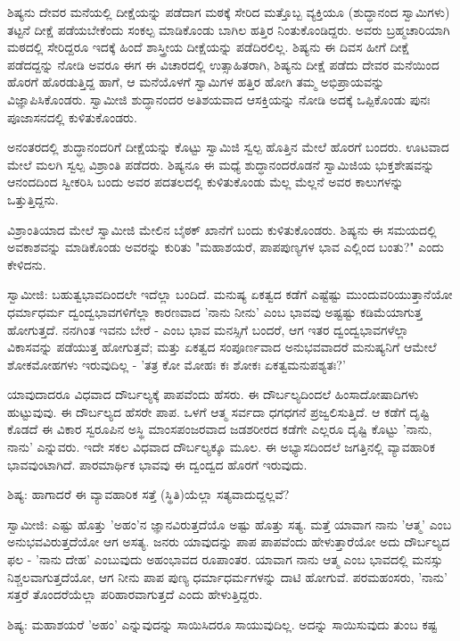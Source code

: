 ಶಿಷ್ಯನು ದೇವರ ಮನೆಯಲ್ಲಿ ದೀಕ್ಷೆಯನ್ನು ಪಡೆದಾಗ ಮಠಕ್ಕೆ ಸೇರಿದ ಮತ್ತೊಬ್ಬ ವ್ಯಕ್ತಿಯೂ (ಶುದ್ಧಾನಂದ ಸ್ವಾಮಿಗಳು) ತಟ್ಟನೆ ದೀಕ್ಷೆ ಪಡೆಯಬೇಕೆಂದು ಸಂಕಲ್ಪ ಮಾಡಿಕೊಂಡು ಬಾಗಿಲ ಹತ್ತಿರ ನಿಂತುಕೊಂಡಿದ್ದರು. ಅವರು ಬ್ರಹ್ಮಚಾರಿಯಾಗಿ ಮಠದಲ್ಲಿ ಸೇರಿದ್ದರೂ ಇದಕ್ಕೆ ಹಿಂದೆ ಶಾಸ್ತ್ರೀಯ ದೀಕ್ಷೆಯನ್ನು ಪಡೆದಿರಲಿಲ್ಲ. ಶಿಷ್ಯನು ಈ ದಿವಸ ಹೀಗೆ ದೀಕ್ಷೆ ಪಡೆದದ್ದನ್ನು ನೋಡಿ ಅವರೂ ಈಗ ಈ ವಿಚಾರದಲ್ಲಿ ಉತ್ಸಾಹಿತರಾಗಿ, ಶಿಷ್ಯನು ದೀಕ್ಷೆ ಪಡೆದು ದೇವರ ಮನೆಯಿಂದ ಹೊರಗೆ ಹೊರಡುತ್ತಿದ್ದ ಹಾಗೆ, ಆ ಮನೆಯೊಳಗೆ ಸ್ವಾಮಿಗಳ ಹತ್ತಿರ ಹೋಗಿ ತಮ್ಮ ಅಭಿಪ್ರಾಯವನ್ನು ವಿಜ್ಞಾಪಿಸಿಕೊಂಡರು. ಸ್ವಾಮೀಜಿ ಶುದ್ಧಾನಂದರ ಅತಿಶಯವಾದ ಆಸಕ್ತಿಯನ್ನು ನೋಡಿ ಅದಕ್ಕೆ ಒಪ್ಪಿಕೊಂಡು ಪುನಃ ಪೂಜಾಸನದಲ್ಲಿ ಕುಳಿತುಕೊಂಡರು.

ಅನಂತರದಲ್ಲಿ ಶುದ್ಧಾನಂದರಿಗೆ ದೀಕ್ಷೆಯನ್ನು ಕೊಟ್ಟು ಸ್ವಾಮಿಜಿ ಸ್ವಲ್ಪ ಹೊತ್ತಿನ ಮೇಲೆ ಹೊರಗೆ ಬಂದರು. ಊಟವಾದ ಮೇಲೆ ಮಲಗಿ ಸ್ವಲ್ಪ ವಿಶ್ರಾಂತಿ ಪಡೆದರು. ಶಿಷ್ಯನೂ ಈ ಮಧ್ಯೆ ಶುದ್ಧಾನಂದರೊಡನೆ ಸ್ವಾಮಿಜಿಯ ಭುಕ್ತಶೇಷವನ್ನು ಆನಂದದಿಂದ ಸ್ವೀಕರಿಸಿ ಬಂದು ಅವರ ಪದತಲದಲ್ಲಿ ಕುಳಿತುಕೊಂಡು ಮೆಲ್ಲ ಮೆಲ್ಲನೆ ಅವರ ಕಾಲುಗಳನ್ನು ಒತ್ತುತ್ತಿದ್ದನು.

ವಿಶ್ರಾಂತಿಯಾದ ಮೇಲೆ ಸ್ವಾಮೀಜಿ ಮೇಲಿನ ಬೈಠಕ್ ಖಾನೆಗೆ ಬಂದು ಕುಳಿತುಕೊಂಡರು. ಶಿಷ್ಯನು ಈ ಸಮಯದಲ್ಲಿ ಅವಕಾಶವನ್ನು ಮಾಡಿಕೊಂಡು ಅವರನ್ನು ಕುರಿತು "ಮಹಾಶಯರೆ, ಪಾಪಪುಣ್ಯಗಳ ಭಾವ ಎಲ್ಲಿಂದ ಬಂತು?" ಎಂದು ಕೇಳಿದನು.

ಸ್ವಾಮೀಜಿ: ಬಹುತ್ವಭಾವದಿಂದಲೇ ಇದೆಲ್ಲಾ ಬಂದಿದೆ. ಮನುಷ್ಯ ಏಕತ್ವದ ಕಡೆಗೆ ಎಷ್ಟೆಷ್ಟು ಮುಂದುವರಿಯುತ್ತಾನೆಯೋ ಧರ್ಮಾಧರ್ಮ ದ್ವಂದ್ವಭಾವಗಳಿಗೆಲ್ಲಾ ಕಾರಣವಾದ 'ನಾನು ನೀನು' ಎಂಬ ಭಾವವು ಅಷ್ಟಷ್ಟು ಕಡಿಮೆಯಾಗುತ್ತ ಹೋಗುತ್ತದೆ. ನನಗಿಂತ ಇವನು ಬೇರೆ - ಎಂಬ ಭಾವ ಮನಸ್ಸಿಗೆ ಬಂದರೆ, ಆಗ ಇತರ ದ್ವಂದ್ವಭಾವಗಳೆಲ್ಲಾ ವಿಕಾಸವನ್ನು ಪಡೆಯುತ್ತ ಹೋಗುತ್ತವೆ; ಮತ್ತು ಏಕತ್ವದ ಸಂಪೂರ್ಣವಾದ ಅನುಭವವಾದರೆ ಮನುಷ್ಯನಿಗೆ ಆಮೇಲೆ ಶೋಕಮೋಹಗಳು ಇರುವುದಿಲ್ಲ - 'ತತ್ರ ಕೋ ಮೋಹಃ ಕಃ ಶೋಕಃ ಏಕತ್ವಮನುಪಶ್ಯತಃ?'

ಯಾವುದಾದರೂ ವಿಧವಾದ ದೌರ್ಬಲ್ಯಕ್ಕೆ ಪಾಪವೆಂದು ಹೆಸರು. ಈ ದೌರ್ಬಲ್ಯದಿಂದಲೆ ಹಿಂಸಾದೋಷಾದಿಗಳು ಹುಟ್ಟುವುವು. ಈ ದೌರ್ಬಲ್ಯದ ಹೆಸರೇ ಪಾಪ. ಒಳಗೆ ಆತ್ಮ ಸರ್ವದಾ ಧಗಧಗನೆ ಪ್ರಜ್ವಲಿಸುತ್ತಿದೆ. ಆ ಕಡೆಗೆ ದೃಷ್ಟಿ ಕೊಡದೆ ಈ ವಿಕಾರ ಸ್ವರೂಪಿನ ಅಸ್ಥಿ ಮಾಂಸಪಂಜರವಾದ ಜಡಶರೀರದ ಕಡೆಗೇ ಎಲ್ಲರೂ ದೃಷ್ಟಿ ಕೊಟ್ಟು 'ನಾನು, ನಾನು' ಎನ್ನುವರು. ಇದೇ ಸಕಲ ವಿಧವಾದ ದೌರ್ಬಲ್ಯಕ್ಕೂ ಮೂಲ. ಈ ಅಭ್ಯಾಸದಿಂದಲೆ ಜಗತ್ತಿನಲ್ಲಿ ವ್ಯಾವಹಾರಿಕ ಭಾವವುಂಟಾಗಿದೆ. ಪಾರಮಾರ್ಥಿಕ ಭಾವವು ಈ ದ್ವಂದ್ವದ ಹೊರಗೆ ಇರುವುದು.

ಶಿಷ್ಯ: ಹಾಗಾದರೆ ಈ ವ್ಯಾವಹಾರಿಕ ಸತ್ತೆ (ಸ್ಥಿತಿ)ಯೆಲ್ಲಾ ಸತ್ಯವಾದುದ್ದಲ್ಲವೆ?

ಸ್ವಾಮೀಜಿ: ಎಷ್ಟು ಹೊತ್ತು 'ಅಹಂ'ನ ಜ್ಞಾನವಿರುತ್ತದೆಯೊ ಅಷ್ಟು ಹೊತ್ತು ಸತ್ಯ. ಮತ್ತೆ ಯಾವಾಗ ನಾನು 'ಆತ್ಮ' ಎಂಬ ಅನುಭವವಿರುತ್ತದೆಯೋ ಆಗ ಅಸತ್ಯ. ಜನರು ಯಾವುದನ್ನು ಪಾಪ ಪಾಪವೆಂದು ಹೇಳುತ್ತಾರೆಯೋ ಅದು ದೌರ್ಬಲ್ಯದ ಫಲ - 'ನಾನು ದೇಹ' ಎಂಬುವುದು ಅಹಂಭಾವದ ರೂಪಾಂತರ. ಯಾವಾಗ ನಾನು ಆತ್ಮ ಎಂಬ ಭಾವದಲ್ಲಿ ಮನಸ್ಸು ನಿಶ್ಚಲವಾಗುತ್ತದೆಯೋ, ಆಗ ನೀನು ಪಾಪ ಪುಣ್ಯ ಧರ್ಮಾಧರ್ಮಗಳನ್ನು ದಾಟಿ ಹೋಗುವೆ. ಪರಮಹಂಸರು, 'ನಾನು' ಸತ್ತರೆ ತೊಂದರೆಯೆಲ್ಲಾ ಪರಿಹಾರವಾಗುತ್ತದೆ ಎಂದು ಹೇಳುತ್ತಿದ್ದರು.

ಶಿಷ್ಯ: ಮಹಾಶಯರೆ 'ಅಹಂ' ಎನ್ನುವುದನ್ನು ಸಾಯಿಸಿದರೂ ಸಾಯುವುದಿಲ್ಲ. ಅದನ್ನು ಸಾಯಿಸುವುದು ತುಂಬ ಕಷ್ಟ

